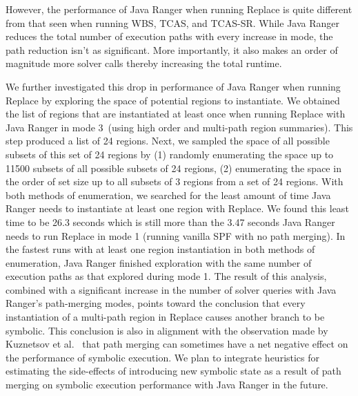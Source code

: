 However, the performance of Java Ranger when running Replace is quite different from that seen when running WBS, TCAS, and TCAS-SR.
%
While Java Ranger reduces the total number of execution paths with every increase in mode, the path reduction isn't as significant.
%
More importantly, it also makes an order of magnitude more solver calls thereby increasing the total runtime.

We further investigated this drop in performance of Java Ranger when running Replace by exploring the space of potential
regions to instantiate.
%
We obtained the list of regions that are instantiated at least once when running Replace with Java Ranger in mode 3~(using
high order and multi-path region summaries).
%
This step produced a list of 24 regions.
%
Next, we sampled the space of all possible subsets of this set of 24 regions by
%
(1) randomly enumerating the space up to 11500 subsets of all possible subsets of 24 regions,
%
(2) enumerating the space in the order of set size up to all subsets of 3 regions from a set of 24 regions.
%
With both methods of enumeration, we searched for the least amount of time Java Ranger needs to instantiate at least one
region with Replace.
%
We found this least time to be 26.3 seconds which is still more than the 3.47 seconds Java Ranger needs to run
Replace in mode 1 (running vanilla SPF with no path merging).
%
In the fastest runs with at least one region instantiation in both methods of enumeration, Java Ranger finished
exploration with the same number of execution paths as that explored during mode 1.
%
The result of this analysis, combined with a significant increase in the number of solver queries with Java Ranger's
path-merging modes, points toward the conclusion that every instantiation of a multi-path region in Replace causes another branch to be
symbolic.
%
This conclusion is also in alignment with the observation made by Kuznetsov et al.~\cite{kuznetsov} that path merging can
sometimes have a net negative effect on the performance of symbolic execution.
%
We plan to integrate heuristics for estimating the side-effects of introducing new symbolic state as a result of
path merging on symbolic execution performance with Java Ranger in the future.
